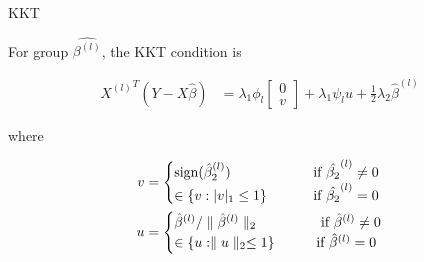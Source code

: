 \documentclass[12pt]{article}
\begin{document}
KKT \cite{tibshirani2013lasso}

For group $\hat{\beta^{(l)}}$, the KKT condition is 

\begin{equation} \label{KKT}
  \begin{split}
  {X^{(l)}}^T(Y-X\hat{\beta}) &= \lambda_1\phi_l \begin{bmatrix}
         0 \\
         v 
       \end{bmatrix}
       + \lambda_1\psi_lu+\frac{1}{2}\lambda_2\hat{\beta}^{(l)}
  \end{split}
\end{equation}

where

\begin{align}
v & = \begin{cases}
  \text{sign}(\hat{\beta}_2^{(l)}) & \text{ \qquad  if $\hat{\beta_2}^{(l)}\neq 0$} \\
  \in\{v:|v|_1\leq 1\}&  \text{ \qquad  if $\hat{\beta_2}^{(l)}= 0$} 
\end{cases}
\\
u & = \begin{cases} 
  \hat{\beta}^{(l)}/\parallel \hat{\beta}^{(l)} \parallel_2 & 
  \text{ \qquad  if $\hat{\beta}^{(l)}\neq 0$} \\
  \in \{u:\parallel u\parallel_2\leq 1\} & \text{\qquad if $\hat{\beta}^{(l)}= 0$}
\end{cases} 
\end{align}
\end{document}
